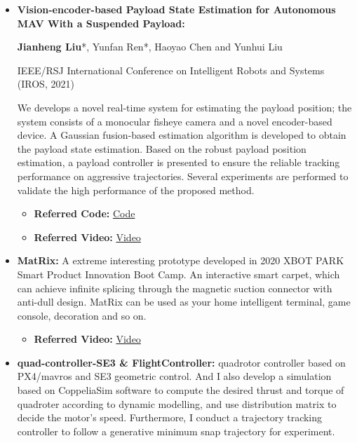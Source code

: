 \documentclass[11pt,a4paper,sans]{moderncv}        %
\begin{document}
{\begin{itemize}
\item \textbf{Vision-encoder-based Payload State Estimation for Autonomous MAV With a Suspended Payload:} 

\textbf{Jianheng Liu}*, Yunfan Ren*, Haoyao Chen and Yunhui Liu

IEEE/RSJ International Conference on Intelligent Robots and Systems (IROS, 2021)

We develops a novel real-time system for estimating the payload position; the system consists of a monocular fisheye camera and a novel encoder-based device. A Gaussian fusion-based estimation algorithm is developed to obtain the payload state estimation. Based on the robust payload position estimation, a payload controller is presented to ensure the reliable tracking performance on aggressive trajectories. Several experiments are performed to validate the high performance of the proposed method. 

\begin{itemize}
\item \textbf{Referred Code:} \href{https://github.com/jianhengLiu/Vision-encoder-based-Payload-State-Estimator}{Code}
\item \textbf{Referred Video:} \href{https://www.bilibili.com/video/BV1Qq4y1U7n4?share_source=copy_web}{Video}
\end{itemize}
\vspace{6pt}

\item \textbf{MatRix:} A extreme interesting prototype developed in 2020 XBOT PARK Smart Product Innovation Boot Camp. An interactive smart carpet, which can achieve infinite splicing through the magnetic suction connector with anti-dull design. MatRix can be used as your home intelligent terminal, game console, decoration and so on.

\begin{itemize}
\item \textbf{Referred Video:} \href{https://www.bilibili.com/video/BV1gb4y127by?share_source=copy_web}{Video}
\end{itemize}

\vspace{6pt}

\item \textbf{quad-controller-SE3 \& FlightController:} quadrotor controller based on PX4/mavros and SE3 geometric control. And I also develop a simulation based on CoppeliaSim software to compute the desired thrust and torque of quadroter according to dynamic modelling, and use distribution matrix to decide the motor's speed. Furthermore, I conduct a trajectory tracking controller to follow a generative minimum snap trajectory for experiment.


\end{itemize}}
\end{document}
